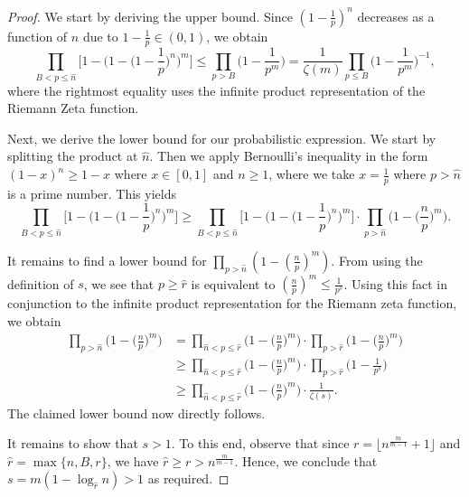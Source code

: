 \documentclass[12pt]{amsart}
\theoremstyle{definition}
\begin{document}
\begin{proof}
	We start by deriving the upper bound. Since $(1 - \frac{1}{p})^n$ decreases as a function of $n$ due to $1 - \frac{1}{p} \in (0, 1)$, we obtain
	$$\prod_{B<p\leq\hat{n}} \Big[1 - \Big(1 - \Big(1 - \frac{1}{p}\Big)^n \Big)^m \Big] \leq \prod_{p>B} \Big(1 - \frac{1}{p^m}\Big) = \frac{1}{\zeta(m)} \prod_{p\leq B} \Big(1 - \frac{1}{p^m}\Big)^{-1},$$
	where the rightmost equality uses the infinite product representation of the Riemann Zeta function.
	
	\vspace{.1 in}
	
	Next, we derive the lower bound for our probabilistic expression. We start by splitting the product at $\hat{n}$. Then we apply Bernoulli's inequality in the form $(1 - x)^n \geq 1 - x$ where $x \in [0, 1]$ and $n \geq 1$, where we take $x = \frac{1}{p}$ where $p > \hat{n}$ is a prime number. This yields 
	$$\prod_{B<p\leq\hat{n}} \Big[1 - \Big(1 - \Big(1 - \frac{1}{p}\Big)^n \Big)^m \Big] \geq \prod_{B<p\leq \hat{n}}\Big[1 - \Big(1 - \Big(1 - \frac{1}{p}\Big)^n \Big)^m \Big] \cdot \prod_{p>\hat{n}}\Big(1 - \Big(\frac{n}{p}\Big)^m\Big).$$
	
	\vspace{.1 in}
	
	It remains to find a lower bound for $\prod_{p>\hat{n}} (1 - (\frac{n}{p})^m)$. From using the definition of $s$, we see that $p \geq \hat{r}$ is equivalent to $(\frac{n}{p})^m \leq \frac{1}{p^s}$. Using this fact in conjunction to the infinite product representation for the Riemann zeta function, we obtain 
	\begin{align*} \prod_{p>\hat{n}}\Big(1 - \Big(\frac{n}{p}\Big)^m\Big) &= \prod_{\hat{n}< p \leq \hat{r}}\Big(1 - \Big(\frac{n}{p}\Big)^m\Big) \cdot \prod_{p>\hat{r}}\Big(1 - \Big(\frac{n}{p}\Big)^m\Big)\\ &\geq  \prod_{\hat{n}< p \leq \hat{r}}\Big(1 - \Big(\frac{n}{p}\Big)^m\Big) \cdot \prod_{p>\hat{r}}\Big(1 - \frac{1}{p^s}\Big)\\ &\geq  \prod_{\hat{n}< p \leq \hat{r}}\Big(1 - \Big(\frac{n}{p}\Big)^m\Big) \cdot \frac{1}{\zeta(s)}. \end{align*}
	The claimed lower bound now directly follows. 
	
	\vspace{.1 in}
	
	It remains to show that $s > 1$. To this end, observe that since $r=\lfloor n^{\frac{m}{m-1}}+1\rfloor$ and $\hat{r} = \max\{n, B, r\}$, we have $\hat{r} \geq r > n^{\frac{m}{m-1}}$. Hence, we conclude that $s = m(1 - \log_{\hat{r}}{n}) > 1$ as required.
\end{proof}
\end{document}
